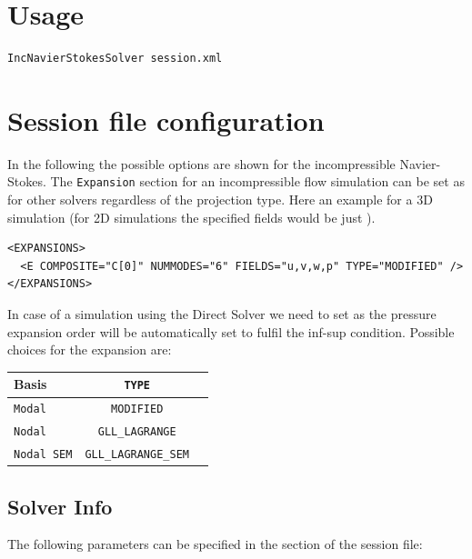 \section{Usage}

\begin{lstlisting}[style=BashInputStyle]
IncNavierStokesSolver session.xml
\end{lstlisting}

\section{Session file configuration}

In the following the possible options are shown for the incompressible
Navier-Stokes. The \texttt{Expansion} section for an incompressible flow
simulation can be set as for other solvers regardless of the projection type.
Here an example for a 3D simulation (for 2D simulations the specified fields
would be just ).

\begin{lstlisting}[style=XMLStyle]
<EXPANSIONS>
  <E COMPOSITE="C[0]" NUMMODES="6" FIELDS="u,v,w,p" TYPE="MODIFIED" />
</EXPANSIONS>
\end{lstlisting}

In case of a simulation using the Direct Solver we need to set
 as the pressure expansion order will be automatically set to
fulfil the inf-sup condition. Possible choices for the expansion 
are:
\begin{center}
\footnotesize
\begin{tabular}{lcc}
\toprule
{Basis} & {\texttt{TYPE}} \\
\midrule
\texttt{Modal} & \texttt{MODIFIED} \\
\texttt{Nodal} & \texttt{GLL\_LAGRANGE} \\
\texttt{Nodal SEM} & \texttt{GLL\_LAGRANGE\_SEM} \\
\bottomrule
\end{tabular}
\end{center}

\subsection{Solver Info}
\label{SectionIncNS_SolverInfo}

The following parameters can be specified in the  section of
the session file:

